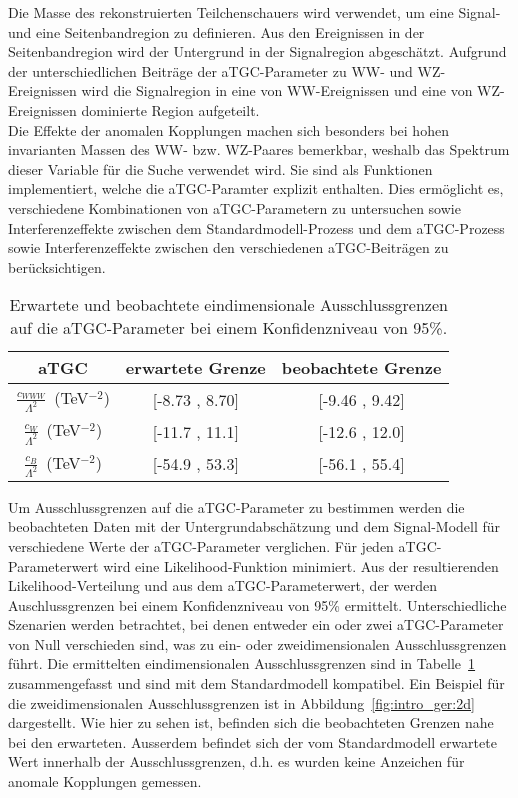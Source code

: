 Die Masse des rekonstruierten Teilchenschauers wird verwendet, um eine Signal- und eine Seitenbandregion zu  definieren. Aus den Ereignissen in der Seitenbandregion wird der Untergrund in der Signalregion abgeschätzt. Aufgrund der unterschiedlichen Beiträge der aTGC-Parameter zu WW- und WZ-Ereignissen wird die Signalregion in eine von WW-Ereignissen und eine von WZ-Ereignissen dominierte Region aufgeteilt. \\

Die Effekte der anomalen Kopplungen machen sich besonders bei hohen invarianten Massen des WW- bzw. WZ-Paares bemerkbar, weshalb das Spektrum dieser Variable für die Suche verwendet wird. Sie sind als Funktionen implementiert, welche die aTGC-Paramter explizit enthalten. Dies ermöglicht es, verschiedene Kombinationen von aTGC-Parametern zu untersuchen sowie Interferenzeffekte zwischen dem Standardmodell-Prozess und dem aTGC-Prozess sowie Interferenzeffekte zwischen den verschiedenen aTGC-Beiträgen zu berücksichtigen.\\

\begin{table}
	\centering
	\caption[Erwartete und beobachtete Ausschlussgrenzen bei einem Konfidenzniveau von 95\%]{Erwartete und beobachtete eindimensionale Ausschlussgrenzen auf die aTGC-Parameter bei einem Konfidenzniveau von 95\%.}
	\label{tab:intro_ger:1d}
	\begin{tabular}{ccc}
	\hline
	aTGC              &     erwartete Grenze & beobachtete Grenze\\
	\hline
	$\frac{c_{WWW}}{\Lambda ^2}$~(TeV$^{-2}$) &  [-8.73 , 8.70] &  [-9.46 , 9.42] \\
	$\frac{c_{W}}{\Lambda ^2}$~(TeV$^{-2}$)   &  [-11.7 , 11.1] &  [-12.6 , 12.0] \\
	$\frac{c_{B}}{\Lambda ^2}$~(TeV$^{-2}$)   & [-54.9 , 53.3] &  [-56.1 , 55.4] \\
	\hline
	\end{tabular}
\end{table}

Um Ausschlussgrenzen auf die aTGC-Parameter zu bestimmen werden die beobachteten Daten mit der Untergrundabschätzung und dem Signal-Modell für verschiedene Werte der aTGC-Parameter verglichen. Für jeden aTGC-Parameterwert wird eine Likelihood-Funktion minimiert. Aus der resultierenden Likelihood-Verteilung und aus dem aTGC-Parameterwert, der  werden Auschlussgrenzen bei einem Konfidenzniveau von 95\% ermittelt. Unterschiedliche Szenarien werden betrachtet, bei denen entweder ein oder zwei aTGC-Parameter von Null verschieden sind, was zu ein- oder zweidimensionalen Ausschlussgrenzen führt. Die ermittelten eindimensionalen Ausschlussgrenzen sind in Tabelle~\ref{tab:intro_ger:1d} zusammengefasst und sind mit dem Standardmodell kompatibel. Ein Beispiel für die zweidimensionalen Ausschlussgrenzen ist in Abbildung~\ref{fig:intro_ger:2d} dargestellt. Wie hier zu sehen ist, befinden sich die beobachteten Grenzen nahe bei den erwarteten. Ausserdem befindet sich der vom Standardmodell erwartete Wert innerhalb der Ausschlussgrenzen, d.h. es wurden keine Anzeichen für anomale Kopplungen gemessen.\\

